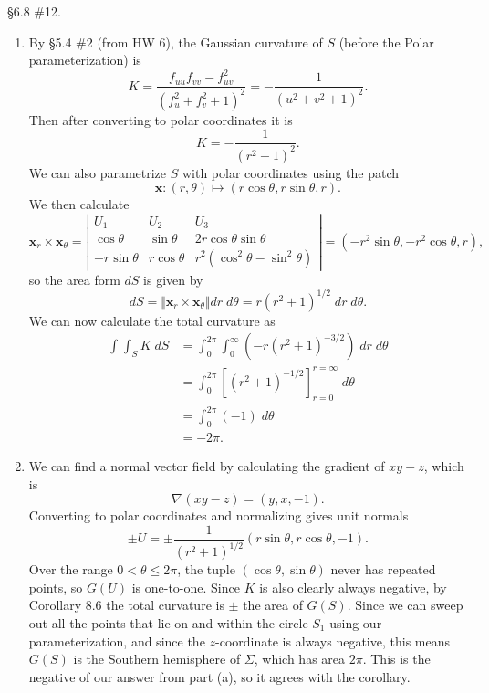 \documentclass[10pt]{report}
\begin{document}
\begin{exer}[]
\S 6.8 \#12.
\end{exer}
\begin{enumerate}
	\item By \S 5.4 \#2 (from HW 6), the Gaussian curvature of $S$ (before the Polar parameterization) is
		\[
			K = \frac{f_{uu}f_{vv}-f_{uv}^2}{(f_{u}^2+f_{v}^2+1)^2} = -\frac{1}{(u^2+v^2+1)^2} .
		\] Then after converting to polar coordinates it is
		\[
			K = -\frac{1}{(r^2+1)^2} .
		\] We can also parametrize $S$ with polar coordinates using the patch
		\[
			\mathbf{x}: (r,\theta) \mapsto  \left( r \cos\theta,r\sin\theta,r \right).
		\] We then calculate
		\[
		\mathbf{x}_{r}\times \mathbf{x}_{\theta} =
		\left|
		\begin{matrix}
			U_1 &U_2 & U_3 \\
			\cos\theta&\sin\theta&2r\cos\theta\sin\theta\\
			-r\sin\theta&r\cos\theta&r^2(\cos^2\theta-\sin^2\theta)
		\end{matrix}
		\right| = (-r^2\sin\theta,-r^2\cos\theta,r),
		\] 
		so the area form $dS$ is given by
		\[
			dS = {\Vert{\mathbf{x}_{r}\times \mathbf{x}_{\theta}}\Vert}dr\;d\theta = r(r^2+1)^{1/2}\;dr\;d\theta.
		\] We can now calculate the total curvature as
		\begin{align*}
			\int_{} \int_{S} K\;dS &= \int_{0}^{2\pi} \int_{0}^{\infty} (-r(r^2+1)^{-3/2})\;dr\;d\theta \\
					       &= \int_{0}^{2\pi} \left[ (r^2+1)^{-1/2} \right]_{r=0}^{r=\infty}\;d\theta \\
					       &= \int_{0}^{2\pi} (-1)\;d\theta \\
					       &= -2\pi.
		\end{align*}
	\item We can find a normal vector field by calculating the gradient of $xy-z$, which is
		\[
			\nabla_{}(xy-z) = \left( y,x,-1 \right).
		\] Converting to polar coordinates and normalizing gives unit normals
		\[
			\pm U = \pm \frac{1}{(r^2+1)^{1/2}} (r\sin\theta,r\cos\theta,-1).
		\] Over the range $0 < \theta \leq 2\pi$, the tuple $(\cos\theta,\sin\theta)$ never has repeated points, so $G(U)$ is one-to-one. Since $K$ is also clearly always negative, by Corollary 8.6 the total curvature is $\pm$ the area of $G(S)$. Since we can sweep out all the points that lie on and within the circle $S_1$ using our parameterization, and since the $z$-coordinate is always negative, this means $G(S)$ is the Southern hemisphere of $\Sigma$, which has area $2\pi$. This is the negative of our answer from part (a), so it agrees with the corollary.
\end{enumerate}
\end{document}
